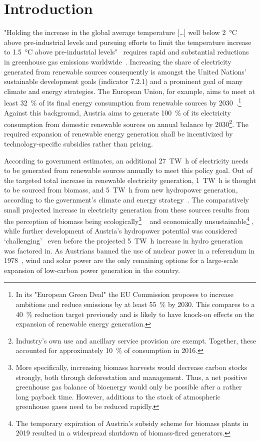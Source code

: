 \documentclass[review, 3p, times, 12pt, authoryear]{elsarticle}
\begin{document}
    \section{Introduction}\label{sec:introduction}
    "Holding the increase in the global average temperature [\ldots] well below \SI{2}{\celsius} above pre-industrial levels and pursuing efforts to limit the temperature increase to \SI{1.5}{\celsius} above pre-industrial levels"~\citep{UNFCCC2015} requires rapid and substantial reductions in greenhouse gas emissions worldwide~\citep{IPCC2018}.
    Increasing the share of electricity generated from renewable sources consequently is amongst the United Nations' sustainable development goals (indicator 7.2.1) and a prominent goal of many climate and energy strategies.
    The European Union, for example, aims to meet at least \SI{32}{\percent} of its final energy consumption from renewable sources by 2030~\citep{EU2018}.\footnote{In its "European Green Deal" the EU Commission proposes to increase ambitions and reduce  emissions by at least \SI{55}{\percent} by 2030. This compares to a \SI{40}{\percent} reduction target previously and is likely to have knock-on effects on the expansion of renewable energy generation.}
    Against this background, Austria aims to generate \SI{100}{\percent} of its electricity consumption from domestic renewable sources on annual balance by 2030\footnote{Industry's own use and ancillary service provision are exempt. Together, these accounted for approximately \SI{10}{\percent} of consumption in 2016.}.
    The required expansion of renewable energy generation shall be incentivized by technology-specific subsidies rather than  pricing.

    According to government estimates, an additional \SI{27}{\tera\watt\hour} of electricity needs to be generated from renewable sources annually to meet this policy goal.
    Out of the targeted total increase in renewable electricity generation, \SI{1}{\tera\watt\hour} is thought to be sourced from biomass, and \SI{5}{\tera\watt\hour} from new hydropower generation, according to the government's climate and energy strategy~.
    The comparatively small projected increase in electricity generation from these sources results from the perception of biomass being ecologically\footnote{More specifically, increasing biomass harvests would decrease carbon stocks strongly, both through deforestation and management. Thus, a net positive greenhouse gas balance of bioenergy would only be possible after a rather long payback time. However, additions to the stock of atmospheric greenhouse gases need to be reduced rapidly.}
    ~\citep{Erb2018} and economically unsustainable\footnote{The temporary expiration of Austria's subsidy scheme for biomass plants in 2019 resulted in a widespread shutdown of biomass-fired generators.}
    , while further development of Austria's hydropower potential was considered `challenging'~\citep{Wagner2015} even before the projected \SI{5}{\tera\watt\hour} increase in hydro generation was factored in.
    As Austrians banned the use of nuclear power in a referendum in 1978~\citep{Pelinka1983}, wind and solar power are the only remaining options for a large-scale expansion of low-carbon power generation in the country.
\end{document}
